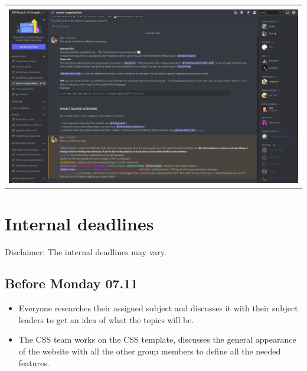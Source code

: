 \documentclass[12pt]{article}
\begin{document}
\begin{tabular}{p{12.3cm} p{4.7cm}}
\begin{flushright}
 \end{flushright}\\
 \multicolumn{2}{c}{\includegraphics[scale=0.405]{server-organization.png}}
\end{tabular}
\newpage

\section{Internal deadlines}
\small{Disclaimer: The internal deadlines may vary.}
\subsection{Before Monday 07.11}
\begin{itemize}[label=$\bullet$]
    \item Everyone researches their assigned subject and discusses it with their subject leaders to get an idea of what the topics will be. 
    \item The CSS team works on the CSS template, discusses the general appearance of the website with all the other group members to define all the needed features.
\end{itemize}
\end{document}
